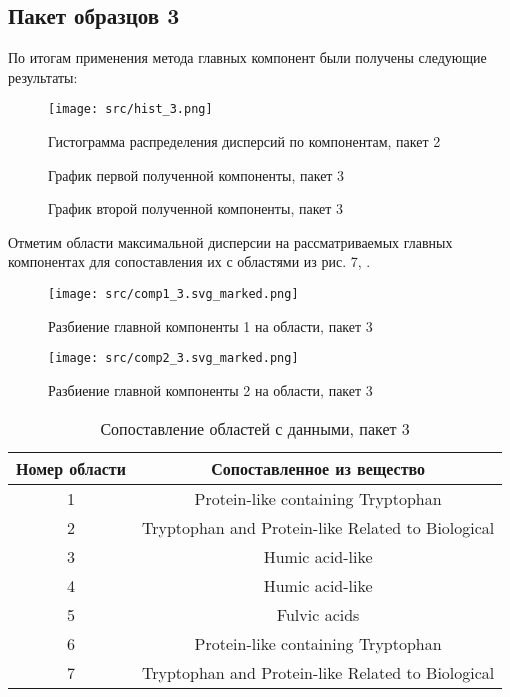 \documentclass[a4paper]{article}
\begin{document}
\subsection{Пакет образцов 3}
По итогам применения метода главных компонент были получены следующие результаты:
\begin{figure}[H]
    \centering
    \texttt{[image: src/hist\_3.png]}
    \caption{Гистограмма распределения дисперсий по компонентам, пакет 2}
    \label{fig:hist_3}
\end{figure}
\begin{figure}[H]
    \centering
    
    
    \caption{График первой полученной компоненты, пакет 3}
    \label{fig:comp_1_3}
\end{figure}
\begin{figure}[H]
    \centering
    
    
    \caption{График второй полученной компоненты, пакет 3}
    \label{fig:comp_2_3}
\end{figure}
Отметим области максимальной дисперсии на рассматриваемых главных компонентах для сопоставления их с областями из рис. 7, \cite{article1}.
\begin{figure}[H]
    \centering
    \texttt{[image: src/comp1\_3.svg\_marked.png]}
    \caption{Разбиение главной компоненты 1 на области, пакет 3}
    \label{fig:comp1_3_marked}
\end{figure}
\begin{figure}[H]
    \centering
    \texttt{[image: src/comp2\_3.svg\_marked.png]}
    \caption{Разбиение главной компоненты 2 на области, пакет 3}
    \label{fig:comp2_3_marked}
\end{figure}
\begin{table}[H]
    \centering
    \begin{tabular}{|c|c|}
        \hline
        Номер области & Сопоставленное из \cite{article1} вещество\\
        \hline  
        1&Protein-like containing Tryptophan\\
        \hline
        2&Tryptophan and Protein-like Related to Biological\\
        \hline
        3&Humic acid-like\\
        \hline
        4&Humic acid-like\\
        \hline
        5&Fulvic acids\\
        \hline
        6&Protein-like containing Tryptophan\\
        \hline
        7&Tryptophan and Protein-like Related to Biological\\
        \hline
    \end{tabular}
    \caption{Сопоставление областей с данными, пакет 3}
    \label{tab:marked_regions_3}
\end{table}
\end{document}
